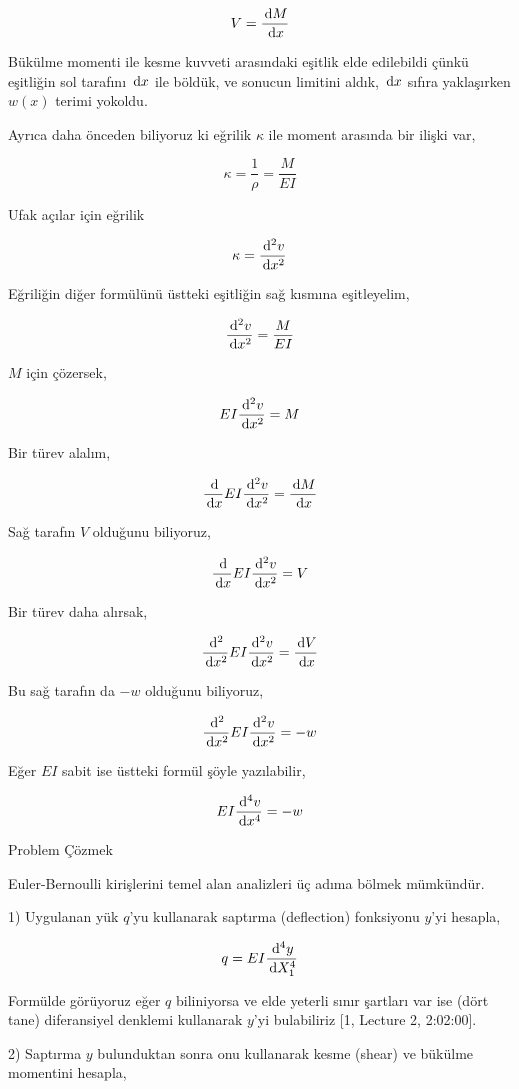 \documentclass[12pt,fleqn]{article}\usepackage{../../common}
\begin{document}
$$
V = \frac{\,\mathrm{d} M}{\,\mathrm{d} x}
$$

Bükülme momenti ile kesme kuvveti arasındaki eşitlik elde edilebildi çünkü
eşitliğin sol tarafını $\,\mathrm{d} x$ ile böldük, ve sonucun limitini aldık, $\,\mathrm{d} x$
sıfıra yaklaşırken $w(x)$ terimi yokoldu.

Ayrıca daha önceden biliyoruz ki eğrilik $\kappa$ ile moment arasında
bir ilişki var,

$$
\kappa = \frac{1}{\rho} = \frac{M}{EI}
$$

Ufak açılar için eğrilik

$$
\kappa = \frac{\,\mathrm{d}^2 v}{\,\mathrm{d} x^2}
$$

Eğriliğin diğer formülünü üstteki eşitliğin sağ kısmına eşitleyelim,

$$
\frac{\,\mathrm{d}^2 v}{\,\mathrm{d} x^2} = \frac{M}{EI}
$$

$M$ için çözersek,

$$
EI \frac{\,\mathrm{d}^2 v}{\,\mathrm{d} x^2} = M
$$

Bir türev alalım,

$$
\frac{\,\mathrm{d} }{\,\mathrm{d} x} EI \frac{\,\mathrm{d}^2 v}{\,\mathrm{d} x^2} = \frac{\,\mathrm{d} M}{\,\mathrm{d} x}
$$

Sağ tarafın $V$ olduğunu biliyoruz,

$$
\frac{\,\mathrm{d} }{\,\mathrm{d} x} EI \frac{\,\mathrm{d}^2 v}{\,\mathrm{d} x^2} = V
$$

Bir türev daha alırsak,

$$
\frac{\,\mathrm{d}^2 }{\,\mathrm{d} x^2} EI \frac{\,\mathrm{d}^2 v}{\,\mathrm{d} x^2} = \frac{\,\mathrm{d} V}{\,\mathrm{d} x}
$$

Bu sağ tarafın da $-w$ olduğunu biliyoruz,

$$
\frac{\,\mathrm{d}^2 }{\,\mathrm{d} x^2} EI \frac{\,\mathrm{d}^2 v}{\,\mathrm{d} x^2} = -w
$$

Eğer $EI$ sabit ise üstteki formül şöyle yazılabilir,
        
$$
EI \frac{\,\mathrm{d}^4 v}{\,\mathrm{d} x^4} = -w
$$

Problem Çözmek

Euler-Bernoulli kirişlerini temel alan analizleri üç adıma bölmek mümkündür.

1) Uygulanan yük $q$'yu kullanarak saptırma (deflection) fonksiyonu $y$'yi hesapla,

$$
q = E I \frac{\,\mathrm{d}^4 y}{\,\mathrm{d} X_1^4}
$$

Formülde görüyoruz eğer $q$ biliniyorsa ve elde yeterli sınır şartları var ise
(dört tane) diferansiyel denklemi kullanarak $y$'yi bulabiliriz
[1, Lecture 2, 2:02:00]. 

2) Saptırma $y$ bulunduktan sonra onu kullanarak kesme (shear) ve bükülme
momentini hesapla,
\end{document}
